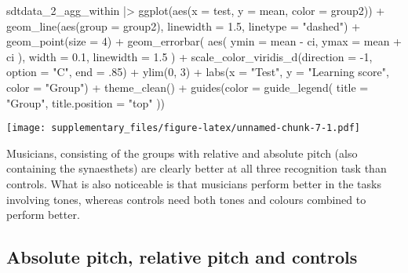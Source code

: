 \documentclass[
  man,floatsintext]{apa7}
\newenvironment{Shaded}{\begin{snugshade}}{\end{snugshade}}
\newcommand{\AttributeTok}[1]{\textcolor[rgb]{0.77,0.63,0.00}{#1}}
\newcommand{\DecValTok}[1]{\textcolor[rgb]{0.00,0.00,0.81}{#1}}
\newcommand{\FloatTok}[1]{\textcolor[rgb]{0.00,0.00,0.81}{#1}}
\newcommand{\FunctionTok}[1]{\textcolor[rgb]{0.00,0.00,0.00}{#1}}
\newcommand{\NormalTok}[1]{#1}
\newcommand{\SpecialCharTok}[1]{\textcolor[rgb]{0.00,0.00,0.00}{#1}}
\newcommand{\StringTok}[1]{\textcolor[rgb]{0.31,0.60,0.02}{#1}}
\begin{document}
\begin{Shaded}
\begin{Highlighting}[]
\NormalTok{sdtdata\_2\_agg\_within }\SpecialCharTok{|\textgreater{}}
  \FunctionTok{ggplot}\NormalTok{(}\FunctionTok{aes}\NormalTok{(}\AttributeTok{x =}\NormalTok{ test, }\AttributeTok{y =}\NormalTok{ mean, }\AttributeTok{color =}\NormalTok{ group2)) }\SpecialCharTok{+}
  \FunctionTok{geom\_line}\NormalTok{(}\FunctionTok{aes}\NormalTok{(}\AttributeTok{group =}\NormalTok{ group2), }\AttributeTok{linewidth =} \FloatTok{1.5}\NormalTok{, }\AttributeTok{linetype =} \StringTok{"dashed"}\NormalTok{) }\SpecialCharTok{+}
  \FunctionTok{geom\_point}\NormalTok{(}\AttributeTok{size =} \DecValTok{4}\NormalTok{) }\SpecialCharTok{+}
  \FunctionTok{geom\_errorbar}\NormalTok{(}
    \FunctionTok{aes}\NormalTok{(}
      \AttributeTok{ymin =}\NormalTok{ mean }\SpecialCharTok{{-}}\NormalTok{ ci,}
      \AttributeTok{ymax =}\NormalTok{ mean }\SpecialCharTok{+}\NormalTok{ ci}
\NormalTok{    ),}
    \AttributeTok{width =} \FloatTok{0.1}\NormalTok{, }\AttributeTok{linewidth =} \FloatTok{1.5}
\NormalTok{  ) }\SpecialCharTok{+}
  \FunctionTok{scale\_color\_viridis\_d}\NormalTok{(}\AttributeTok{direction =} \SpecialCharTok{{-}}\DecValTok{1}\NormalTok{, }\AttributeTok{option =} \StringTok{"C"}\NormalTok{, }\AttributeTok{end =}\NormalTok{ .}\DecValTok{85}\NormalTok{) }\SpecialCharTok{+}
  \FunctionTok{ylim}\NormalTok{(}\DecValTok{0}\NormalTok{, }\DecValTok{3}\NormalTok{) }\SpecialCharTok{+}
  \FunctionTok{labs}\NormalTok{(}\AttributeTok{x =} \StringTok{"Test"}\NormalTok{, }\AttributeTok{y =} \StringTok{"Learning score"}\NormalTok{, }\AttributeTok{color =} \StringTok{"Group"}\NormalTok{) }\SpecialCharTok{+}
  \FunctionTok{theme\_clean}\NormalTok{() }\SpecialCharTok{+}
  \FunctionTok{guides}\NormalTok{(}\AttributeTok{color =} \FunctionTok{guide\_legend}\NormalTok{(}
    \AttributeTok{title =} \StringTok{"Group"}\NormalTok{,}
    \AttributeTok{title.position =} \StringTok{"top"}
\NormalTok{  ))}
\end{Highlighting}
\end{Shaded}

\texttt{[image: supplementary\_files/figure-latex/unnamed-chunk-7-1.pdf]}

Musicians, consisting of the groups with relative and absolute pitch (also containing the synaesthets) are clearly better at all three recognition task than controls. What is also noticeable is that musicians perform better in the tasks involving tones, whereas controls need both tones and colours combined to perform better.

\hypertarget{absolute-pitch-relative-pitch-and-controls}{%
\subsection{Absolute pitch, relative pitch and controls}\label{absolute-pitch-relative-pitch-and-controls}}
\end{document}
